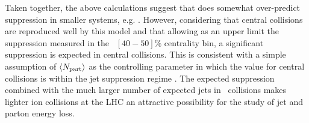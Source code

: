 Taken together, the above calculations suggest that \jewel does somewhat over-predict suppression in smaller systems, e.g. \XeXe. However, considering that central collisions are reproduced well by this model and that allowing as an upper limit the suppression measured in the \PbPb\ $[40-50]\%$ centrality bin, a significant suppression is expected in central \ArAr collisions.  This is consistent with a simple assumption of $\left\langle N_{\rm part} \right\rangle$ as the controlling parameter in which the value for central \ArAr collisions is within the jet suppression regime \cite{Sirunyan:2018eqi,ATLAS:2018vmo}.  The expected suppression combined with the much larger number of expected jets in \ArAr\ collisions makes lighter ion collisions at the LHC an attractive possibility for the study of jet and parton energy loss.
